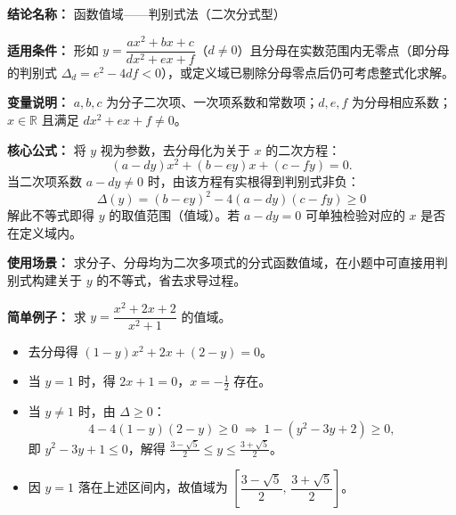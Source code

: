 \textbf{结论名称：} 函数值域——判别式法（二次分式型）

\textbf{适用条件：} 形如 $y=\dfrac{a x^2+b x+c}{d x^2+e x+f}$（$d\neq0$）且分母在实数范围内无零点（即分母的判别式 $\Delta_d=e^2-4df<0$），或定义域已剔除分母零点后仍可考虑整式化求解。

\textbf{变量说明：} $a,b,c$ 为分子二次项、一次项系数和常数项；$d,e,f$ 为分母相应系数；$x\in\mathbb{R}$ 且满足 $d x^2+e x+f\neq0$。

\textbf{核心公式：}
将 $y$ 视为参数，去分母化为关于 $x$ 的二次方程：
\[
(a-d y)x^2+(b-e y)x+(c-f y)=0.
\]
当二次项系数 $a-d y\neq0$ 时，由该方程有实根得到判别式非负：
\[
\boxed{\Delta(y)=(b-e y)^2-4(a-d y)(c-f y)\ge 0}
\]
解此不等式即得 $y$ 的取值范围（值域）。若 $a-d y=0$ 可单独检验对应的 $x$ 是否在定义域内。

\textbf{使用场景：} 求分子、分母均为二次多项式的分式函数值域，在小题中可直接用判别式构建关于 $y$ 的不等式，省去求导过程。

\textbf{简单例子：}
求 $y=\dfrac{x^2+2x+2}{x^2+1}$ 的值域。
\begin{itemize}
\item 去分母得 $(1-y)x^2+2x+(2-y)=0$。
\item 当 $y=1$ 时，得 $2x+1=0$，$x=-\frac12$ 存在。
\item 当 $y\neq1$ 时，由 $\Delta\geq0$：
  \[
  4-4(1-y)(2-y)\ge0 \;\Longrightarrow\; 1-(y^2-3y+2)\ge0,
  \]
  即 $y^2-3y+1\leq0$，解得 $\frac{3-\sqrt5}{2}\leq y\leq\frac{3+\sqrt5}{2}$。
\item 因 $y=1$ 落在上述区间内，故值域为 $\left[\dfrac{3-\sqrt5}{2},\,\dfrac{3+\sqrt5}{2}\right]$。
\end{itemize}
